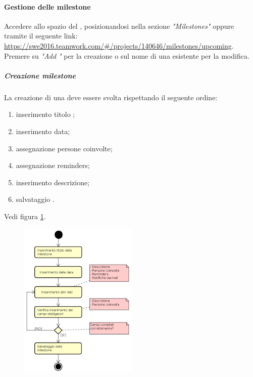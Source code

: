             \paragraph{Gestione delle milestone}
            Accedere allo spazio  del , posizionandosi nella sezione \textit{"Milestones"} oppure tramite il seguente link: \url{https://swe2016.teamwork.com/#/projects/140646/milestones/upcoming}. Premere su \textit{"Add "} per la creazione o sul nome di una  esistente per la modifica.
            \subparagraph{Creazione milestone}\label{sec:creazionemilestone}
                La creazione di una  deve essere svolta rispettando il seguente ordine:
    			\begin{enumerate}
    				\item inserimento titolo ;
    				\item inserimento data;
    				\item assegnazione persone coinvolte;
    				\item assegnazione reminders;
    				\item inserimento descrizione;
    				\item salvataggio .
    			\end{enumerate}
                Vedi figura \ref{fig:procinsmilestone}.
    			\begin{figure}[h!]
                    \centering
    				\includegraphics[width=0.5\textwidth]{img/proc_ins_milestone}
                    \label{fig:procinsmilestone}
    			\end{figure}\mbox{}\\
